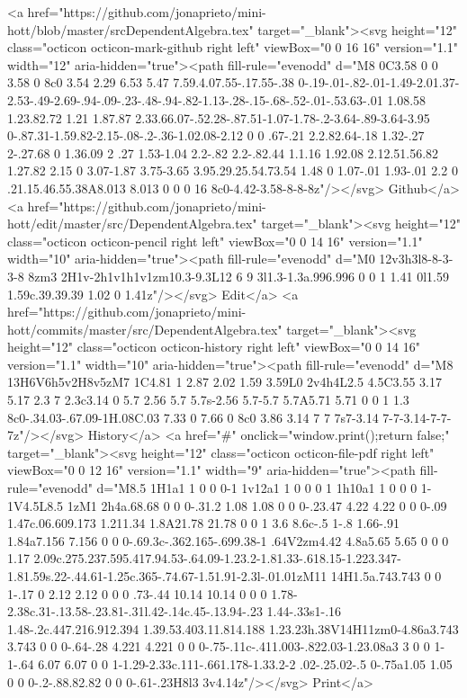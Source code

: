       <a href="https://github.com/jonaprieto/mini-hott/blob/master/srcDependentAlgebra.tex" target="_blank"><svg height="12" class="octicon octicon-mark-github right left" viewBox="0 0 16 16" version="1.1" width="12" aria-hidden="true"><path fill-rule="evenodd" d="M8 0C3.58 0 0 3.58 0 8c0 3.54 2.29 6.53 5.47 7.59.4.07.55-.17.55-.38 0-.19-.01-.82-.01-1.49-2.01.37-2.53-.49-2.69-.94-.09-.23-.48-.94-.82-1.13-.28-.15-.68-.52-.01-.53.63-.01 1.08.58 1.23.82.72 1.21 1.87.87 2.33.66.07-.52.28-.87.51-1.07-1.78-.2-3.64-.89-3.64-3.95 0-.87.31-1.59.82-2.15-.08-.2-.36-1.02.08-2.12 0 0 .67-.21 2.2.82.64-.18 1.32-.27 2-.27.68 0 1.36.09 2 .27 1.53-1.04 2.2-.82 2.2-.82.44 1.1.16 1.92.08 2.12.51.56.82 1.27.82 2.15 0 3.07-1.87 3.75-3.65 3.95.29.25.54.73.54 1.48 0 1.07-.01 1.93-.01 2.2 0 .21.15.46.55.38A8.013 8.013 0 0 0 16 8c0-4.42-3.58-8-8-8z"/></svg> Github</a>
      <a href="https://github.com/jonaprieto/mini-hott/edit/master/src/DependentAlgebra.tex" target="_blank"><svg height="12" class="octicon octicon-pencil right left" viewBox="0 0 14 16" version="1.1" width="10" aria-hidden="true"><path fill-rule="evenodd" d="M0 12v3h3l8-8-3-3-8 8zm3 2H1v-2h1v1h1v1zm10.3-9.3L12 6 9 3l1.3-1.3a.996.996 0 0 1 1.41 0l1.59 1.59c.39.39.39 1.02 0 1.41z"/></svg> Edit</a>
      <a href="https://github.com/jonaprieto/mini-hott/commits/master/src/DependentAlgebra.tex" target="_blank"><svg height="12" class="octicon octicon-history right left" viewBox="0 0 14 16" version="1.1" width="10" aria-hidden="true"><path fill-rule="evenodd" d="M8 13H6V6h5v2H8v5zM7 1C4.81 1 2.87 2.02 1.59 3.59L0 2v4h4L2.5 4.5C3.55 3.17 5.17 2.3 7 2.3c3.14 0 5.7 2.56 5.7 5.7s-2.56 5.7-5.7 5.7A5.71 5.71 0 0 1 1.3 8c0-.34.03-.67.09-1H.08C.03 7.33 0 7.66 0 8c0 3.86 3.14 7 7 7s7-3.14 7-7-3.14-7-7-7z"/></svg> History</a>
      <a  href="#" onclick="window.print();return false;" target="_blank"><svg height="12" class="octicon octicon-file-pdf right left" viewBox="0 0 12 16" version="1.1" width="9" aria-hidden="true"><path fill-rule="evenodd" d="M8.5 1H1a1 1 0 0 0-1 1v12a1 1 0 0 0 1 1h10a1 1 0 0 0 1-1V4.5L8.5 1zM1 2h4a.68.68 0 0 0-.31.2 1.08 1.08 0 0 0-.23.47 4.22 4.22 0 0 0-.09 1.47c.06.609.173 1.211.34 1.8A21.78 21.78 0 0 1 3.6 8.6c-.5 1-.8 1.66-.91 1.84a7.156 7.156 0 0 0-.69.3c-.362.165-.699.38-1 .64V2zm4.42 4.8a5.65 5.65 0 0 0 1.17 2.09c.275.237.595.417.94.53-.64.09-1.23.2-1.81.33-.618.15-1.223.347-1.81.59s.22-.44.61-1.25c.365-.74.67-1.51.91-2.3l-.01.01zM11 14H1.5a.743.743 0 0 1-.17 0 2.12 2.12 0 0 0 .73-.44 10.14 10.14 0 0 0 1.78-2.38c.31-.13.58-.23.81-.31l.42-.14c.45-.13.94-.23 1.44-.33s1-.16 1.48-.2c.447.216.912.394 1.39.53.403.11.814.188 1.23.23h.38V14H11zm0-4.86a3.743 3.743 0 0 0-.64-.28 4.221 4.221 0 0 0-.75-.11c-.411.003-.822.03-1.23.08a3 3 0 0 1-1-.64 6.07 6.07 0 0 1-1.29-2.33c.111-.661.178-1.33.2-2 .02-.25.02-.5 0-.75a1.05 1.05 0 0 0-.2-.88.82.82 0 0 0-.61-.23H8l3 3v4.14z"/></svg> Print</a>
